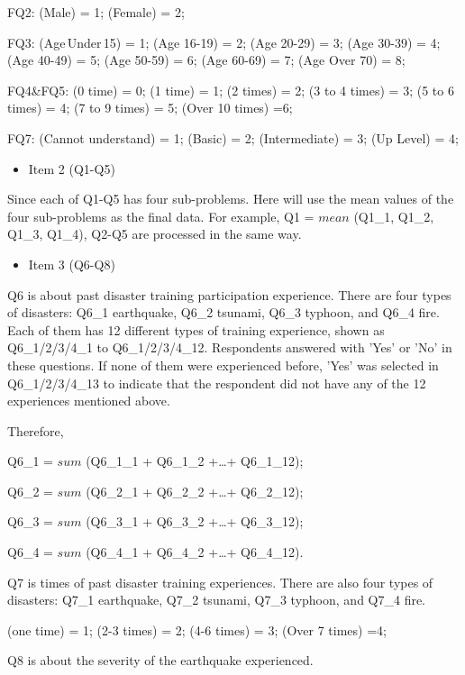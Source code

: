 FQ2: (Male) = 1; (Female) = 2;

FQ3: (Age\,Under\,15) = 1; (Age 16-19) = 2; (Age 20-29) = 3; (Age 30-39) = 4; (Age 40-49) = 5; (Age 50-59) = 6; (Age 60-69) = 7; (Age Over 70) = 8;

FQ4\&FQ5: (0 time) = 0; (1 time) = 1; (2 times) = 2; (3 to 4 times) = 3; (5 to 6 times) = 4; (7 to 9 times) = 5; (Over 10 times) =6;


FQ7: (Cannot understand) = 1; (Basic) = 2; (Intermediate) = 3; (Up Level) = 4; 

\begin{itemize}
\item Item 2 (Q1-Q5)
\end{itemize}

Since each of Q1-Q5 has four sub-problems. Here will use the mean values of the four sub-problems as the final data. For example, Q1 = $mean$ (Q1\_1, Q1\_2, Q1\_3, Q1\_4), Q2-Q5 are processed in the same way.

\begin{itemize}
\item Item 3 (Q6-Q8)
\end{itemize}

Q6 is about past disaster training participation experience. There are four types of disasters: Q6\_1 earthquake, Q6\_2 tsunami, Q6\_3 typhoon, and Q6\_4 fire. Each of them has 12 different types of training experience, shown as Q6\_1/2/3/4\_1 to Q6\_1/2/3/4\_12. Respondents answered with 'Yes' or 'No' in these questions. If none of them were experienced before, 'Yes' was selected in Q6\_1/2/3/4\_13 to indicate that the respondent did not have any of the 12 experiences mentioned above. 

Therefore, 

Q6\_1 = $sum$ (Q6\_1\_1 + Q6\_1\_2 +\dots+ Q6\_1\_12);

Q6\_2 = $sum$ (Q6\_2\_1 + Q6\_2\_2 +\dots+ Q6\_2\_12);

Q6\_3 = $sum$ (Q6\_3\_1 + Q6\_3\_2 +\dots+ Q6\_3\_12);

Q6\_4 = $sum$ (Q6\_4\_1 + Q6\_4\_2 +\dots+ Q6\_4\_12).

Q7 is times of past disaster training experiences. There are also four types of disasters: Q7\_1 earthquake, Q7\_2 tsunami, Q7\_3 typhoon, and Q7\_4 fire.
 
(one time) = 1; (2-3 times) = 2; (4-6 times) = 3; (Over 7 times) =4;

Q8 is about the severity of the earthquake experienced.

